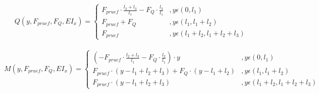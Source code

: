\begin{equation}\label{eq:34}
	Q(y,F_{pruef},F_{Q},EI_{x})=\left\{\begin{array}{ll}
		F_{pruef}\cdot \frac{l_{2}+l_{3}}{l_{1}}-F_{Q}\cdot \frac{l_{2}}{l_{1}}&,y\epsilon (0,l_{1})\\
		F_{pruef}+F_{Q}&,y\epsilon (l_{1}, l_{1}+l_{2})\\
		F_{pruef}&,y\epsilon (l_{1}+l_{2}, l_{1}+l_{2}+l_{3})
	\end{array}\right.
\end{equation}\\
\begin{equation}\label{eq:35}
	M(y,F_{pruef},F_{Q},EI_{x})=\left\{\begin{array}{ll}
		(-F_{pruef}\cdot \frac{l_{2}+l_{3}}{l_{1}}-F_{Q}\cdot \frac{l_{2}}{l_{1}})\cdot y&,y\epsilon (0,l_{1})\\
		F_{pruef}\cdot (y-l_{1}+l_{2}+l_{3})+F_{Q}\cdot (y-l_{1}+l_{2})&,y\epsilon (l_{1}, l_{1}+l_{2})\\
		F_{pruef}\cdot (y-l_{1}+l_{2}+l_{3})&,y\epsilon (l_{1}+l_{2}, l_{1}+l_{2}+l_{3})
	\end{array}\right.
\end{equation}\\
